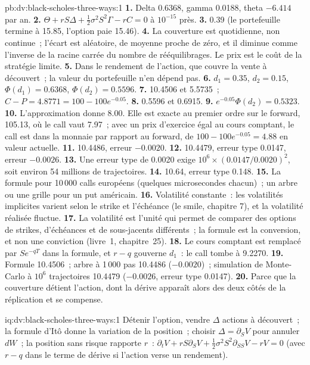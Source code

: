 \begin{solution}{pb:dv:black-scholes-three-ways:1}
\textbf{1.} Delta 0.6368, gamma 0.0188, theta $-6.414$ par an.
\textbf{2.} $\Theta+rS\Delta+\tfrac12\sigma^2S^2\Gamma-rC=0$ à $10^{-15}$ près.
\textbf{3.} 0.39 (le portefeuille termine à 15.85, l'option paie 15.46).
\textbf{4.} La couverture est quotidienne, non continue~; l'écart est aléatoire, de moyenne proche de
zéro, et il diminue comme l'inverse de la racine carrée du nombre de rééquilibrages.
Le prix est le coût de la stratégie limite.
\textbf{5.} Dans le rendement de l'action, que couvre la vente à découvert~; la
valeur du portefeuille n'en dépend pas.
\textbf{6.} $d_1=0.35$, $d_2=0.15$, $\Phi(d_1)=0.6368$, $\Phi(d_2)=0.5596$.
\textbf{7.} 10.4506 et 5.5735~; $C-P=4.8771=100-100e^{-0.05}$.
\textbf{8.} 0.5596 et 0.6915.
\textbf{9.} $e^{-0.05}\Phi(d_2)=0.5323$.
\textbf{10.} L'approximation donne 8.00. Elle est exacte au premier ordre sur le forward,
105.13, où le call vaut 7.97~; avec un prix d'exercice égal au cours comptant, le call est
dans la monnaie par rapport au forward, de $100-100e^{-0.05}=4.88$ en valeur actuelle.
\textbf{11.} 10.4486, erreur $-0.0020$.
\textbf{12.} 10.4479, erreur type 0.0147, erreur $-0.0026$.
\textbf{13.} Une erreur type de 0.0020 exige $10^6\times(0.0147/0.0020)^2$, soit environ 54
millions de trajectoires.
\textbf{14.} 10.64, erreur type 0.148.
\textbf{15.} La formule pour 10\,000 calls européens (quelques microsecondes chacun)~; un arbre ou une grille
pour un put américain.
\textbf{16.} Volatilité constante~: les volatilités implicites varient selon le strike et l'échéance
(le smile, chapitre 7), et la volatilité réalisée fluctue.
\textbf{17.} La volatilité est l'unité qui permet de comparer des options de strikes, d'échéances et
de sous-jacents différents~; la formule est la conversion, et non une conviction
(livre~1, chapitre~25).
\textbf{18.} Le cours comptant est remplacé par $Se^{-qT}$ dans la formule, et $r-q$ gouverne $d_1$~:
le call tombe à 9.2270.
\textbf{19.} Formule 10.4506~; arbre à 1\,000 pas 10.4486 ($-0.0020$)~; simulation de
Monte-Carlo à $10^6$ trajectoires 10.4479 ($-0.0026$, erreur type 0.0147).
\textbf{20.} Parce que la couverture détient l'action, dont la dérive apparaît alors des deux
côtés de la réplication et se compense.
\end{solution}

\begin{solution}{iq:dv:black-scholes-three-ways:1}
Détenir l'option, vendre $\Delta$ actions à découvert~; la formule d'Itô donne la variation de la position~; choisir
$\Delta=\partial_SV$ pour annuler $dW$~; la position sans risque rapporte $r$~:
$\partial_tV+rS\partial_SV+\tfrac12\sigma^2S^2\partial_{SS}V-rV=0$ (avec $r-q$ dans le
terme de dérive si l'action verse un rendement).
\end{solution}

